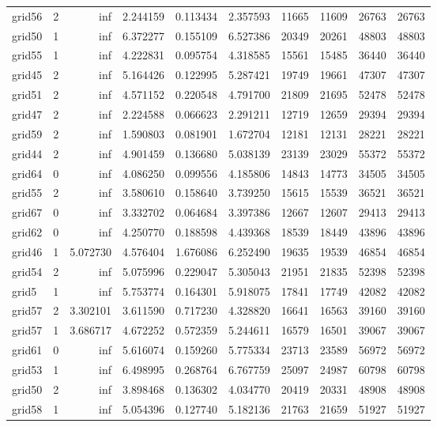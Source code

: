 \begin{longtable}{|l|r|r|r|r|r|r|r|r|r|}
grid56 & 2 & inf & 2.244159 & 0.113434 & 2.357593 & 11665 & 11609 & 26763 & 26763 \\
grid50 & 1 & inf & 6.372277 & 0.155109 & 6.527386 & 20349 & 20261 & 48803 & 48803 \\
grid55 & 1 & inf & 4.222831 & 0.095754 & 4.318585 & 15561 & 15485 & 36440 & 36440 \\
grid45 & 2 & inf & 5.164426 & 0.122995 & 5.287421 & 19749 & 19661 & 47307 & 47307 \\
grid51 & 2 & inf & 4.571152 & 0.220548 & 4.791700 & 21809 & 21695 & 52478 & 52478 \\
grid47 & 2 & inf & 2.224588 & 0.066623 & 2.291211 & 12719 & 12659 & 29394 & 29394 \\
grid59 & 2 & inf & 1.590803 & 0.081901 & 1.672704 & 12181 & 12131 & 28221 & 28221 \\
grid44 & 2 & inf & 4.901459 & 0.136680 & 5.038139 & 23139 & 23029 & 55372 & 55372 \\
grid64 & 0 & inf & 4.086250 & 0.099556 & 4.185806 & 14843 & 14773 & 34505 & 34505 \\
grid55 & 2 & inf & 3.580610 & 0.158640 & 3.739250 & 15615 & 15539 & 36521 & 36521 \\
grid67 & 0 & inf & 3.332702 & 0.064684 & 3.397386 & 12667 & 12607 & 29413 & 29413 \\
grid62 & 0 & inf & 4.250770 & 0.188598 & 4.439368 & 18539 & 18449 & 43896 & 43896 \\
grid46 & 1 & 5.072730 & 4.576404 & 1.676086 & 6.252490 & 19635 & 19539 & 46854 & 46854 \\
grid54 & 2 & inf & 5.075996 & 0.229047 & 5.305043 & 21951 & 21835 & 52398 & 52398 \\
grid5 & 1 & inf & 5.753774 & 0.164301 & 5.918075 & 17841 & 17749 & 42082 & 42082 \\
grid57 & 2 & 3.302101 & 3.611590 & 0.717230 & 4.328820 & 16641 & 16563 & 39160 & 39160 \\
grid57 & 1 & 3.686717 & 4.672252 & 0.572359 & 5.244611 & 16579 & 16501 & 39067 & 39067 \\
grid61 & 0 & inf & 5.616074 & 0.159260 & 5.775334 & 23713 & 23589 & 56972 & 56972 \\
grid53 & 1 & inf & 6.498995 & 0.268764 & 6.767759 & 25097 & 24987 & 60798 & 60798 \\
grid50 & 2 & inf & 3.898468 & 0.136302 & 4.034770 & 20419 & 20331 & 48908 & 48908 \\
grid58 & 1 & inf & 5.054396 & 0.127740 & 5.182136 & 21763 & 21659 & 51927 & 51927 \\

\end{longtable}
